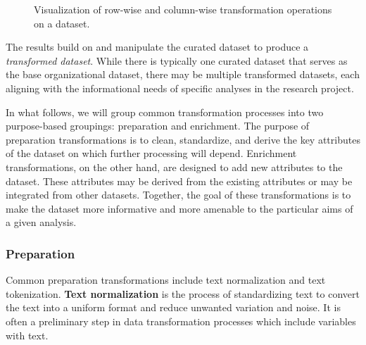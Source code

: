 \documentclass[
  letterpaper,
  DIV=11,
  numbers=noendperiod]{scrreprt}
\theoremstyle{definition}
\theoremstyle{remark}
\begin{document}
\begin{figure}[H]


\caption{\label{fig-ud-transformations}Visualization of row-wise and
column-wise transformation operations on a dataset.}

\end{figure}%

The results build on and manipulate the curated dataset to produce a
\emph{transformed dataset}. While there is typically one curated dataset
that serves as the base organizational dataset, there may be multiple
transformed datasets, each aligning with the informational needs of
specific analyses in the research project.

In what follows, we will group common transformation processes into two
purpose-based groupings: preparation and enrichment. The purpose of
preparation transformations is to clean, standardize, and derive the key
attributes of the dataset on which further processing will depend.
Enrichment transformations, on the other hand, are designed to add new
attributes to the dataset. These attributes may be derived from the
existing attributes or may be integrated from other datasets. Together,
the goal of these transformations is to make the dataset more
informative and more amenable to the particular aims of a given
analysis.

\subsubsection{Preparation}\label{preparation}

Common preparation transformations include text normalization and text
tokenization. \textbf{Text normalization} is the process of
standardizing text to convert the text into a uniform format and reduce
unwanted variation and noise. It is often a preliminary step in data
transformation processes which include variables with text.
\end{document}
